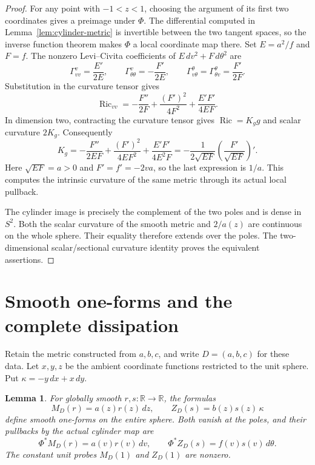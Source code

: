 \documentclass[11pt]{article}
\newtheorem{lemma}[theorem]{Lemma}
\newcommand{\R}{\mathbb R}
\begin{document}
\begin{proof}
For any point with $-1<z<1$, choosing the argument of its first two
coordinates gives a preimage under $\Phi$. The differential computed in
Lemma~\ref{lem:cylinder-metric} is invertible between the two tangent spaces,
so the inverse function theorem makes $\Phi$ a local coordinate map there.
Set $E=a^2/f$ and $F=f$. The nonzero Levi--Civita coefficients of
$E\,dv^2+F\,d\theta^2$ are
\[
 \Gamma^v_{vv}=\frac{E'}{2E},\qquad
 \Gamma^v_{\theta\theta}=-\frac{F'}{2E},\qquad
 \Gamma^\theta_{v\theta}=\Gamma^\theta_{\theta v}=\frac{F'}{2F}.
\]
Substitution in the curvature tensor gives
\[
 \operatorname{Ric}_{vv}
 =-\frac{F''}{2F}+\frac{(F')^2}{4F^2}+\frac{E'F'}{4EF}.
\]
In dimension two, contracting the curvature tensor gives
$\operatorname{Ric}=K_g g$ and scalar curvature $2K_g$. Consequently
\[
 K_g
 =-\frac{F''}{2EF}+\frac{(F')^2}{4EF^2}+\frac{E'F'}{4E^2F}
 =-\frac1{2\sqrt{EF}}\left(\frac{F'}{\sqrt{EF}}\right)'.
\]
Here $\sqrt{EF}=a>0$ and $F'=f'=-2va$, so the last expression is $1/a$.
This computes the intrinsic curvature of the same metric through its
actual local pullback.

The cylinder image is precisely the complement of the two poles and is
dense in $S^2$. Both the scalar curvature of the smooth metric and
$2/a(z)$ are continuous on the whole sphere. Their equality therefore
extends over the poles. The two-dimensional scalar/sectional curvature
identity proves the equivalent assertions.
\end{proof}

\section{Smooth one-forms and the complete dissipation}

Retain the metric constructed from $a,b,c$, and write $D=(a,b,c)$ for these data.
Let $x,y,z$ be the ambient coordinate functions restricted to the unit sphere. Put
$\kappa=-y\,dx+x\,dy$.

\begin{lemma}\label{lem:global-forms}
For globally smooth $r,s:\R\to\R$, the formulas
\[
 M_D(r)=a(z)r(z)\,dz,\qquad Z_D(s)=b(z)s(z)\,\kappa
\]
define smooth one-forms on the entire sphere. Both vanish at the poles,
and their pullbacks by the actual cylinder map are
\begin{equation}\label{eq:forms-cylinder}
 \Phi^*M_D(r)=a(v)r(v)\,dv,\qquad
 \Phi^*Z_D(s)=f(v)s(v)\,d\theta.
\end{equation}
The constant unit probes $M_D(1)$ and $Z_D(1)$ are nonzero.
\end{lemma}
\end{document}
